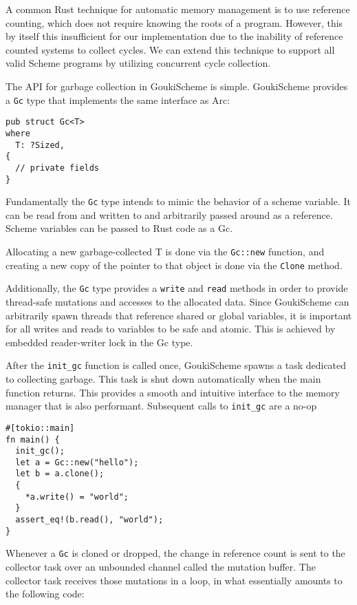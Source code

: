 \documentclass[sigplan,authordraft]{acmart}
\begin{document}
A common Rust technique for automatic memory management is to use reference
counting, which does not require knowing the roots of a program. However, this
by itself this insufficient for our implementation due to the inability of
reference counted systems to collect cycles\cite{rc}. We can extend this
technique to support all valid Scheme programs by utilizing concurrent cycle
collection\cite{cc}.

The API for garbage collection in GoukiScheme is simple. GoukiScheme provides a
\texttt{Gc} type that implements the same interface as Arc:

\begin{verbatim}
pub struct Gc<T>
where
  T: ?Sized,
{
  // private fields
}
\end{verbatim}

Fundamentally the \texttt{Gc} type intends to mimic the behavior of a scheme variable.
It can be read from and written to and arbitrarily passed around as a
reference. Scheme variables can be passed to Rust code as a Gc. 

Allocating a new garbage-collected T is done via the \texttt{Gc::new} function, and
creating a new copy of the pointer to that object is done via the \texttt{Clone}
method.

Additionally, the \texttt{Gc} type provides a \texttt{write} and \texttt{read}
methods in order to provide thread-safe mutations and accesses to the allocated
data. Since GoukiScheme can arbitrarily spawn threads that reference shared or
global variables, it is important for all writes and reads to variables to be safe
and atomic. This is achieved by embedded reader-writer lock in the Gc type.

After the \texttt{init\_gc} function is called once, GoukiScheme spawns a task
dedicated to collecting garbage. This task is shut down automatically when the
main function returns. This provides a smooth and intuitive interface to the
memory manager that is also performant. Subsequent calls to \texttt{init\_gc}
are a no-op

\begin{verbatim}
#[tokio::main]
fn main() {
  init_gc();
  let a = Gc::new("hello");
  let b = a.clone();
  {
    *a.write() = "world";
  }
  assert_eq!(b.read(), "world");
}
\end{verbatim}

Whenever a \texttt{Gc} is cloned or dropped, the change in reference count is
sent to the collector task over an unbounded channel called the mutation buffer.
The collector task receives those mutations in a loop, in what essentially amounts
to the following code:
\end{document}
